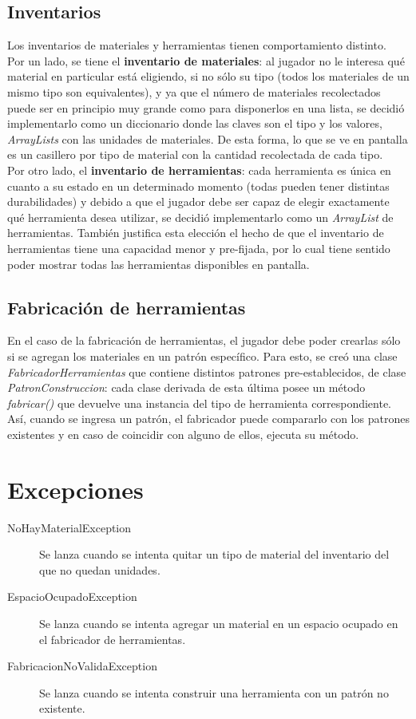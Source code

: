 \documentclass[titlepage,a4paper]{article}
\begin{document}
\subsection{Inventarios}
	Los inventarios de materiales y herramientas tienen comportamiento distinto.\\Por un lado, se tiene el \textbf{inventario de materiales}: al jugador no le interesa qué material en particular está eligiendo, si no sólo su tipo (todos los materiales de un mismo tipo son equivalentes), y ya que el número de materiales recolectados puede ser en principio muy grande como para disponerlos en una lista, se decidió implementarlo como un diccionario donde las claves son el tipo y los valores, \emph{ArrayLists} con las unidades de materiales. De esta forma, lo que se ve en pantalla es un casillero por tipo de material con la cantidad recolectada de cada tipo.\\
Por otro lado, el \textbf{inventario de herramientas}: cada herramienta es única en cuanto a su estado en un determinado momento (todas pueden tener distintas durabilidades) y debido a que el jugador debe ser capaz de elegir exactamente qué herramienta desea utilizar, se decidió implementarlo como un \emph{ArrayList} de herramientas. También justifica esta elección el hecho de que el inventario de herramientas tiene una capacidad menor y pre-fijada, por lo cual tiene sentido poder mostrar todas las herramientas disponibles en pantalla.
\subsection{Fabricación de herramientas}
	En el caso de la fabricación de herramientas, el jugador debe poder crearlas sólo si se agregan los materiales en un patrón específico. Para esto, se creó una clase \emph{FabricadorHerramientas} que contiene distintos patrones pre-establecidos, de clase \emph{PatronConstruccion}: cada clase derivada de esta última posee un método \emph{fabricar()} que devuelve una instancia del tipo de herramienta correspondiente. Así, cuando se ingresa un patrón, el fabricador puede compararlo con los patrones existentes y en caso de coincidir con alguno de ellos, ejecuta su método.

\section{Excepciones}\label{sec:excepciones}
\begin{description}
	\item[NoHayMaterialException] Se lanza cuando se intenta quitar un tipo de material del inventario del que no quedan unidades.
	\item[EspacioOcupadoException] Se lanza cuando se intenta agregar un material en un espacio ocupado en el fabricador de herramientas.
	\item[FabricacionNoValidaException] Se lanza cuando se intenta construir una herramienta con un patrón no existente.
\end{description}
\end{document}
